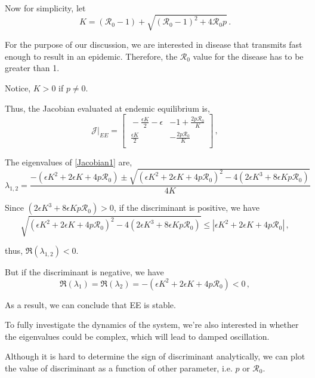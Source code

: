 \documentclass[12pt]{article}
\newcommand{\R}{\mathcal{R}}
\begin{document}
Now for simplicity, let 
\begin{equation}\label{E:}
K = (\R_0-1)+ \sqrt{(\R_0-1)^2+4\R_0 p} \,.
\end{equation}

For the purpose of our discussion, we are interested in disease that transmits fast enough to result in an epidemic. Therefore, the $\R_0$ value for the disease has to be greater than 1.

Notice, $K>0$ if $p\neq 0$.

Thus, the Jacobian evaluated at endemic equilibrium is,
\begin{equation}
\mathcal{J}|_{EE} =
\begin{bmatrix}
    \ -\frac{\epsilon K}{2}-\epsilon       & -1+\frac{2p \R_0}{K} \\
    \ \frac{\epsilon K}{2}       & -\frac{2p \R_0}{K} \\
\end{bmatrix} \label{Jacobian1} \,,
\end{equation}

The eigenvalues of \autoref{Jacobian1} are,
\begin{equation}
\lambda_{1,2} = \frac{-(\epsilon K^2+2\epsilon K +4p\mathcal{R}_0) \pm \sqrt{(\epsilon K^2+2\epsilon K +4p\mathcal{R}_0)^2-4(2\epsilon K^3+8\epsilon Kp\mathcal{R}_0)}}{4K}
\end{equation}

Since $(2\epsilon K^3+8\epsilon Kp\mathcal{R}_0)>0$, if the discriminant is positive, we have
\begin{equation}
\sqrt{(\epsilon K^2+2\epsilon K +4p\mathcal{R}_0)^2-4(2\epsilon
  K^3+8\epsilon Kp\mathcal{R}_0)}
 \leq|\epsilon K^2+2\epsilon K +4p\mathcal{R}_0|  \,,
\end{equation}

thus, $\Re(\lambda_{1,2})<0$.

But if the discriminant is negative, we have
\begin{equation}
\Re(\lambda_1)=\Re(\lambda_2)=-(\epsilon K^2+2\epsilon K +4p\mathcal{R}_0)<0  \,,
\end{equation}

As a result, we can conclude that EE is stable.

To fully investigate the dynamics of the system, we're also interested in whether the eigenvalues could be complex, which will lead to damped oscillation. 

Although it is hard to determine the sign of discriminant analytically, we can plot the value of discriminant as a function of other parameter, i.e. $p$ or $\R_0$.
\end{document}
